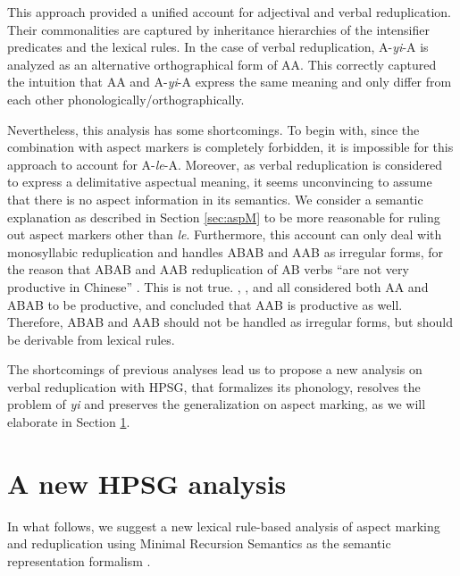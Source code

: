 \documentclass[11pt,a4paper,fleqn,draft]{article}
\begin{document}
This approach provided a unified account for adjectival and verbal reduplication.
Their commonalities are captured by inheritance hierarchies of the intensifier predicates and the lexical rules.
In the case of verbal reduplication, A-\emph{yi}-A is analyzed as an alternative orthographical form of AA.
This correctly captured the intuition that AA and A-\emph{yi}-A express the same meaning and only differ from each other phonologically/orthographically.

Nevertheless, this analysis has some shortcomings.
To begin with, since the combination with aspect markers is completely forbidden, it is impossible for this approach to account for A-\emph{le}-A.
Moreover, as verbal reduplication is  considered to express a delimitative aspectual meaning,
it seems unconvincing to assume that there is no aspect information in its semantics.
We consider a semantic explanation as described in Section \ref{sec:aspM} to be more reasonable for ruling out aspect markers other than \emph{le}.
Furthermore, this account can only deal with monosyllabic reduplication and handles ABAB and AAB as irregular forms, for the reason that ABAB and AAB reduplication of AB verbs ``are not very productive in Chinese'' \citep[102]{FanSongBond2015}.
This is not true. 
\citet{BascianoMelloni2017}, \citet{MelloniBasciano2018},  \citet{Xie2020}  and \citet{Xing2000stat} all considered both AA and ABAB to be productive, 
and \citet{Xing2000stat} concluded that AAB is productive as well.
Therefore, ABAB and AAB should not be handled as  irregular forms, 
but should be derivable from lexical rules.

The shortcomings of previous analyses lead us to propose a new analysis on verbal reduplication with HPSG, that formalizes its phonology, resolves the problem of \emph{yi} and preserves the generalization on aspect marking, as we will elaborate in Section \ref{ch:HPSG-redup}. 




\section{A new HPSG analysis}\label{ch:HPSG-redup}

In what follows, we suggest a new lexical rule-based analysis of aspect marking and reduplication
using Minimal Recursion Semantics as the semantic representation formalism \citep{CFPS2005a}.
\end{document}
